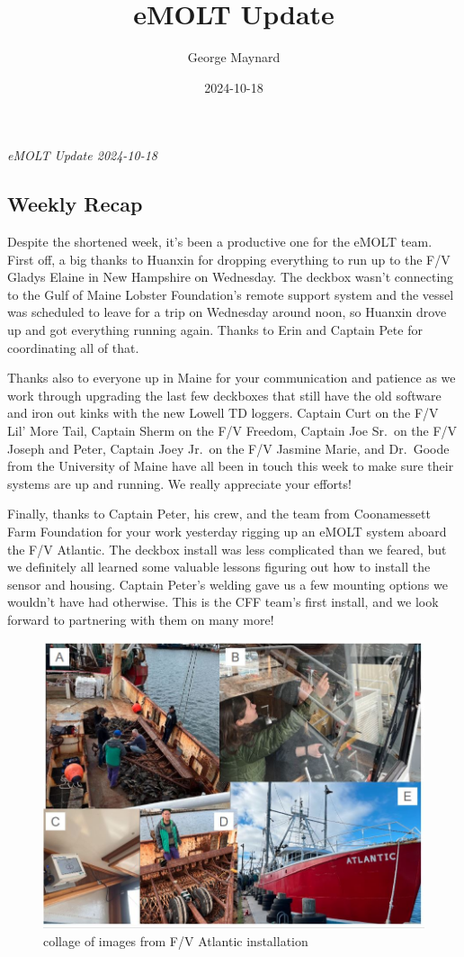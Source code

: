 \documentclass[
]{article}
\title{eMOLT Update}
\author{George Maynard}
\date{2024-10-18}
\begin{document}
\maketitle

\emph{eMOLT Update 2024-10-18 }

\hypertarget{weekly-recap}{%
\subsection{Weekly Recap}\label{weekly-recap}}

Despite the shortened week, it's been a productive one for the eMOLT
team. First off, a big thanks to Huanxin for dropping everything to run
up to the F/V Gladys Elaine in New Hampshire on Wednesday. The deckbox
wasn't connecting to the Gulf of Maine Lobster Foundation's remote
support system and the vessel was scheduled to leave for a trip on
Wednesday around noon, so Huanxin drove up and got everything running
again. Thanks to Erin and Captain Pete for coordinating all of that.

Thanks also to everyone up in Maine for your communication and patience
as we work through upgrading the last few deckboxes that still have the
old software and iron out kinks with the new Lowell TD loggers. Captain
Curt on the F/V Lil' More Tail, Captain Sherm on the F/V Freedom,
Captain Joe Sr.~on the F/V Joseph and Peter, Captain Joey Jr.~on the F/V
Jasmine Marie, and Dr.~Goode from the University of Maine have all been
in touch this week to make sure their systems are up and running. We
really appreciate your efforts!

Finally, thanks to Captain Peter, his crew, and the team from
Coonamessett Farm Foundation for your work yesterday rigging up an eMOLT
system aboard the F/V Atlantic. The deckbox install was less complicated
than we feared, but we definitely all learned some valuable lessons
figuring out how to install the sensor and housing. Captain Peter's
welding gave us a few mounting options we wouldn't have had otherwise.
This is the CFF team's first install, and we look forward to partnering
with them on many more!

\begin{figure}
\centering
\includegraphics{Atlantic_collage.JPG}
\caption{collage of images from F/V Atlantic installation}
\end{figure}
\end{document}
